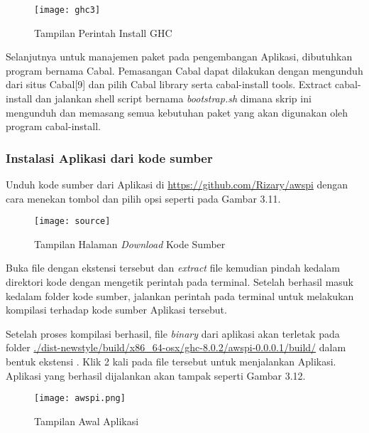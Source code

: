 \documentclass[pi.tex]{subfile}
\begin{document}
  \begin{figure}[H]
      \centering
  \texttt{[image: ghc3]}
  \caption[Tampilan Perintah Install GHC]{Tampilan Perintah Install GHC}
  \end{figure}

  \hspace{10pt}Selanjutnya untuk manajemen paket pada pengembangan Aplikasi, dibutuhkan program bernama Cabal. Pemasangan Cabal dapat dilakukan dengan mengunduh dari situs Cabal[9] dan pilih Cabal library serta cabal-install tools. Extract cabal-install dan jalankan shell script bernama \emph{bootstrap.sh} dimana skrip ini mengunduh dan memasang semua kebutuhan paket yang akan digunakan oleh program cabal-install.
  
\subsubsection{Instalasi Aplikasi dari kode sumber}\hspace{10pt}
Unduh kode sumber dari Aplikasi di \url{https://github.com/Rizary/awspi} dengan cara menekan tombol  dan pilih opsi  seperti pada Gambar 3.11.

\begin{figure}[H]
    \centering
  \texttt{[image: source]}
  \caption[Tampilan Halaman \emph{Download} Kode Sumber]{Tampilan Halaman \emph{Download} Kode Sumber}
  \end{figure}


\hspace{10pt}Buka file dengan ekstensi  tersebut dan \emph{extract} file kemudian pindah kedalam direktori kode dengan mengetik perintah  pada terminal. Setelah berhasil masuk kedalam folder kode sumber, jalankan perintah  pada terminal untuk melakukan kompilasi terhadap kode sumber Aplikasi tersebut.

  \hspace{10pt}Setelah proses kompilasi berhasil, file \emph{binary} dari aplikasi akan terletak pada folder \url{./dist-newstyle/build/x86_64-osx/ghc-8.0.2/awspi-0.0.0.1/build/} dalam bentuk ekstensi . Klik 2 kali pada file tersebut untuk menjalankan Aplikasi. Aplikasi yang berhasil dijalankan akan tampak seperti Gambar 3.12.
  
  \begin{figure}[H]
    \centering
  \texttt{[image: awspi.png]}
  \caption[Tampilan Awal Aplikasi]{Tampilan Awal Aplikasi}
  \end{figure}
\end{document}

